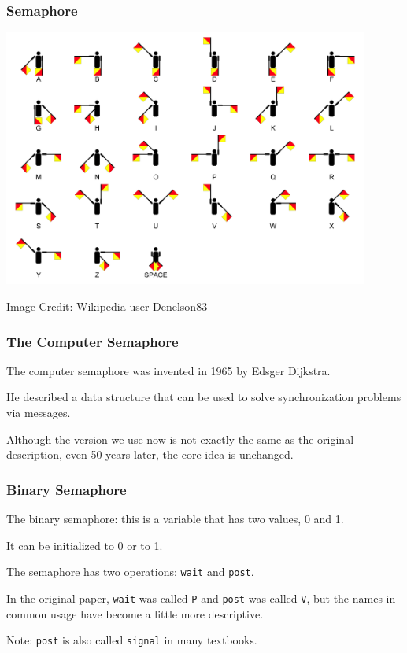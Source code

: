 \begin{frame}
	\frametitle{Semaphore}

	\begin{center}
		\includegraphics[width=0.9\textwidth]{images/semaphore-signals.jpg}
	\end{center}
	\hfill Image Credit: Wikipedia user Denelson83

\end{frame}


\begin{frame}
	\frametitle{The Computer Semaphore}

	The computer semaphore was invented in 1965 by Edsger Dijkstra.

	He described a data structure that can be used to solve synchronization problems via messages.

	Although the version we use now is not exactly the same as the original description, even 50 years later, the core idea is unchanged.


\end{frame}

\begin{frame}
	\frametitle{Binary Semaphore}

	The \alert{binary semaphore}: this is a variable that has two values, 0 and 1.

	It can be initialized to 0 or to 1.

	The semaphore has two operations: \texttt{wait} and \texttt{post}.

	In the original paper, \texttt{wait} was called \texttt{P} and \texttt{post} was called \texttt{V}, but the names in common usage have become a little more descriptive.

	Note: \texttt{post} is also called \texttt{signal} in many textbooks.


\end{frame}

